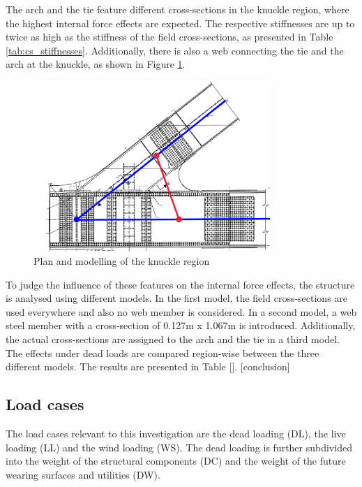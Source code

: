 The arch and the tie feature different cross-sections in the knuckle region, where the highest internal force effects are expected. The respective stiffnesses are up to twice as high as the stiffness of the field cross-sections, as presented in Table \ref{tab:cs_stiffnesses}. Additionally, there is also a web connecting the tie and the arch at the knuckle, as shown in Figure \ref{fig:knuckle_region}.



\begin{figure}[H]
    \centering
    \includegraphics[width=0.8\textwidth]{overleaf/Pictures/Knuckle region.png}
    \caption{Plan and modelling of the knuckle region}
    \label{fig:knuckle_region}
\end{figure}

To judge the influence of these features on the internal force effects, the structure is analysed using different models. In the first model, the field cross-sections are used everywhere and also no web member is considered. In a second model, a web steel member with a cross-section of 0.127m x 1.067m is introduced. Additionally, the actual cross-sections are assigned to the arch and the tie in a third model. The effects under dead loads are compared region-wise between the three different models. The results are presented in Table []. [conclusion]

\newpage
\subsection{Load cases} \label{sec:met_loads}
The load cases relevant to this investigation are the dead loading (DL), the live loading (LL) and the wind loading (WS). The dead loading is further subdivided into the weight of the structural components (DC) and the weight of the future wearing surfaces and utilities (DW).

